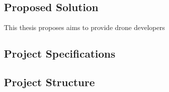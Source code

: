 
\subsection{Proposed Solution}
    This thesis proposes aims to provide drone developers 


\subsection{Project Specifications}

\subsection{Project Structure}
\label{subsection:project_structure}
